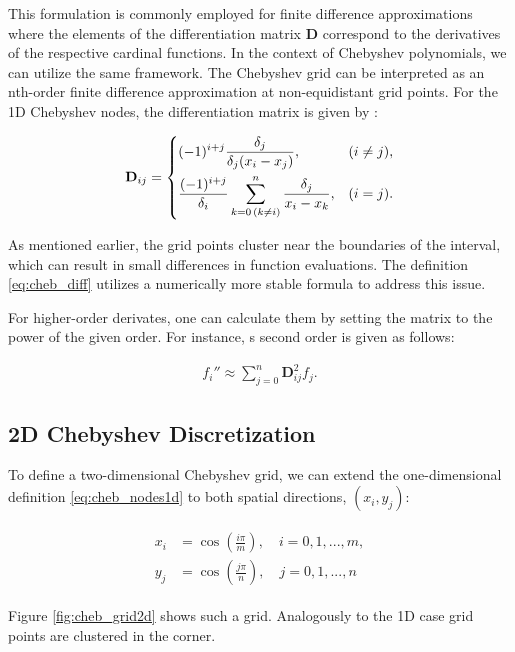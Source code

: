 This formulation is commonly employed for finite difference approximations
where the elements of the differentiation matrix $\mathbf{D}$ correspond to the
derivatives of the respective cardinal functions. In the context of Chebyshev
polynomials, we can utilize the same framework. The Chebyshev grid can be
interpreted as an nth-order finite difference approximation at non-equidistant
grid points. For the 1D Chebyshev nodes, the differentiation matrix is given by
\citep{meseguer2020}:

\begin{align}
\mathbf{D}_{ij} =
\begin{dcases}
  (-1)^{i+j} \frac{\delta_j}{\delta_j(x_i - x_j)},
    & (i \neq j), \\
  \frac{(-1)^{i+j}}{\delta_i} \sum^{n}_{k=0 \, (k \neq i)}
    \frac{\delta_j}{x_i - x_k}, & (i = j).
\end{dcases}
\label{eq:cheb_diff}
\end{align}

As mentioned earlier, the grid points cluster near the boundaries of the
interval, which can result in small differences in function evaluations. The
definition \eqref{eq:cheb_diff} utilizes a numerically more stable formula to
address this issue.

For higher-order derivates, one can calculate them by setting the matrix to the
power of the given order. For instance, s second order is given as follows:

\begin{align}
  f_i'' \approx \sum_{j=0}^{n}\mathbf{D}_{ij}^{2}f_j.
\end{align}

\subsection{2D Chebyshev Discretization}

To define a two-dimensional Chebyshev grid, we can extend the one-dimensional
definition \eqref{eq:cheb_nodes1d} to both spatial directions, $(x_i, y_j)$:

\begin{align} \label{eq:cheb_nodes2d}
  \begin{split}
  x_i & = \cos(\frac{i \pi}{m}), \quad i = 0,1,...,m, \\ 
  y_j &  = \cos(\frac{j \pi}{n}), \quad j = 0,1,...,n
  \end{split}
\end{align}

Figure \ref{fig:cheb_grid2d} shows such a grid. Analogously to the
1D case grid points are clustered in the corner. \\

